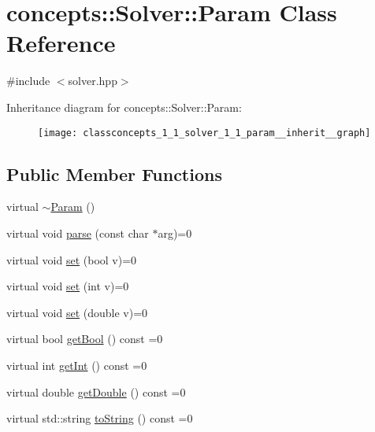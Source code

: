 \hypertarget{classconcepts_1_1_solver_1_1_param}{}\section{concepts\+:\+:Solver\+:\+:Param Class Reference}
\label{classconcepts_1_1_solver_1_1_param}


{\ttfamily \#include $<$solver.\+hpp$>$}



Inheritance diagram for concepts\+:\+:Solver\+:\+:Param\+:\nopagebreak
\begin{figure}[H]
\begin{center}
\leavevmode
\texttt{[image: classconcepts\_1\_1\_solver\_1\_1\_param\_\_inherit\_\_graph]}
\end{center}
\end{figure}
\subsection*{Public Member Functions}
\begin{DoxyCompactItemize}
\item 
virtual \hyperlink{classconcepts_1_1_solver_1_1_param_a9cfb9b36634ad826bf5766306b9823bd}{$\sim$\+Param} ()
\item 
virtual void \hyperlink{classconcepts_1_1_solver_1_1_param_a0c2e4d895747668b01339db9226eceae}{parse} (const char $\ast$arg)=0
\item 
virtual void \hyperlink{classconcepts_1_1_solver_1_1_param_aa525a1a88dd771eaf5d66f35323fbb86}{set} (bool v)=0
\item 
virtual void \hyperlink{classconcepts_1_1_solver_1_1_param_ad3de8144a70e67eeae4278f534e46274}{set} (int v)=0
\item 
virtual void \hyperlink{classconcepts_1_1_solver_1_1_param_a35b7155d8f6db1b3e63e60b883beebcb}{set} (double v)=0
\item 
virtual bool \hyperlink{classconcepts_1_1_solver_1_1_param_aaca8a78f4669d189764e9e654143d705}{get\+Bool} () const =0
\item 
virtual int \hyperlink{classconcepts_1_1_solver_1_1_param_ab849633a029055c00d828df3adb0546e}{get\+Int} () const =0
\item 
virtual double \hyperlink{classconcepts_1_1_solver_1_1_param_a50d288b81da0b77d342e46e75f9b4bfc}{get\+Double} () const =0
\item 
virtual std\+::string \hyperlink{classconcepts_1_1_solver_1_1_param_abcbd9c68852499c7be9ebf6a2d22f4b5}{to\+String} () const =0
\end{DoxyCompactItemize}


